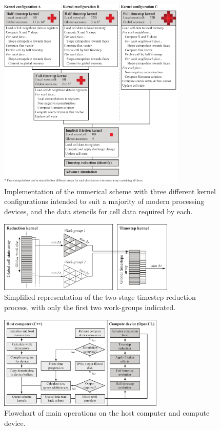 \documentclass[11pt,english,a4paper]{article}
\begin{document}
\begin{figure}[tbh]
\centering
\includegraphics[width=0.8\textwidth]{Figure_5_Colour.pdf}
\caption{Implementation of the numerical scheme with three different kernel configurations intended to suit a majority of modern processing devices, and the data stencils for cell data required by each.}
\label{Kernels}
\end{figure}
\begin{figure}[tbh]
\centering
\includegraphics[width=0.75\textwidth]{Figure_6_Greyscale.pdf}
\caption{Simplified representation of the two-stage timestep reduction process, with only the first two work-groups indicated.}
\label{ReductionProcess}
\end{figure}
\begin{figure}[tbh]
\centering
\includegraphics[width=0.7\textwidth]{Figure_7_Greyscale.pdf}
\caption{Flowchart of main operations on the host computer and compute device.}
\label{ComputerDeviceInteraction}
\end{figure}
\end{document}
